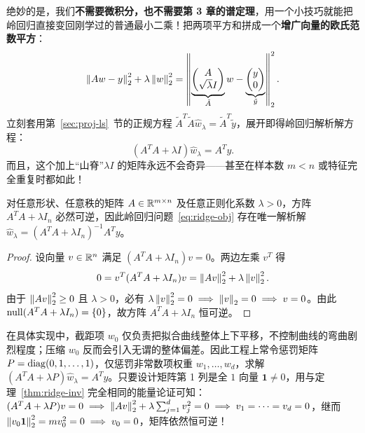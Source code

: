 绝妙的是，我们\textbf{不需要微积分，也不需要第 3 章的谱定理}，用一个小技巧就能把岭回归直接变回刚学过的普通最小二乘！把两项平方和拼成一个\textbf{增广向量的欧氏范数平方}：
\begin{equation}\label{eq:ridge-aug}
\left\|Aw - y\right\|_2^2 + \lambda \left\|w\right\|_2^2
= \left\|\underbrace{\begin{pmatrix} A \\ \sqrt{\lambda} I \end{pmatrix}}_{\tilde{A}} w - \underbrace{\begin{pmatrix} y \\ 0 \end{pmatrix}}_{\tilde{y}}\right\|_2^2.
\end{equation}
立刻套用第~\ref{sec:proj-ls}~节的正规方程 $\tilde{A}^T \tilde{A} \hat{w}_\lambda = \tilde{A}^T \tilde{y}$，展开即得岭回归解析解方程：
\begin{equation}\label{eq:ridge-normal}
(A^T A + \lambda I) \hat{w}_\lambda = A^T y.
\end{equation}
而且，这个加上“山脊”$\lambda I$ 的矩阵永远不会奇异——甚至在样本数 $m < n$ 或特征完全重复时都如此！

\begin{thmBox}
\begin{theorem}[岭回归矩阵恒可逆定理]\label{thm:ridge-inv}
对任意形状、任意秩的矩阵 $A \in \mathbb{R}^{m \times n}$ 及任意正则化系数 $\lambda > 0$，方阵 $A^T A + \lambda I_n$ 必然可逆，因此岭回归问题~\eqref{eq:ridge-obj} 存在唯一解析解 $\hat{w}_\lambda = (A^T A + \lambda I_n)^{-1} A^T y$。
\end{theorem}
\end{thmBox}

\begin{proof}
设向量 $v \in \mathbb{R}^n$ 满足 $(A^T A + \lambda I_n) v = 0$。两边左乘 $v^T$ 得
\[
0 = v^T (A^T A + \lambda I_n) v = \left\|Av\right\|_2^2 + \lambda \left\|v\right\|_2^2.
\]
由于 $\left\|Av\right\|_2^2 \ge 0$ 且 $\lambda > 0$，必有 $\lambda \left\|v\right\|_2^2 = 0 \implies \left\|v\right\|_2 = 0 \implies v = 0$。由此 $\operatorname{null}(A^T A + \lambda I_n) = \{0\}$，故方阵 $A^T A + \lambda I_n$ 恒可逆。
\end{proof}

\begin{remark}
在具体实现中，截距项 $w_0$ 仅负责把拟合曲线整体上下平移，不控制曲线的弯曲剧烈程度；压缩 $w_0$ 反而会引入无谓的整体偏差。因此工程上常令惩罚矩阵 $P = \operatorname{diag}(0, 1, \dots, 1)$，仅惩罚非常数项权重 $w_1, \dots, w_d$，求解 $(A^T A + \lambda P)\hat{w}_\lambda = A^T y$。只要设计矩阵第 1 列是全 $1$ 向量 $\mathbf{1} \neq 0$，用与定理~\ref{thm:ridge-inv} 完全相同的能量论证可知：$(A^T A + \lambda P)v = 0 \implies \left\|Av\right\|_2^2 + \lambda\sum_{j=1}^d v_j^2 = 0 \implies v_1 = \dots = v_d = 0$，继而 $\left\|v_0 \mathbf{1}\right\|_2^2 = m v_0^2 = 0 \implies v_0 = 0$，矩阵依然恒可逆！
\end{remark}

